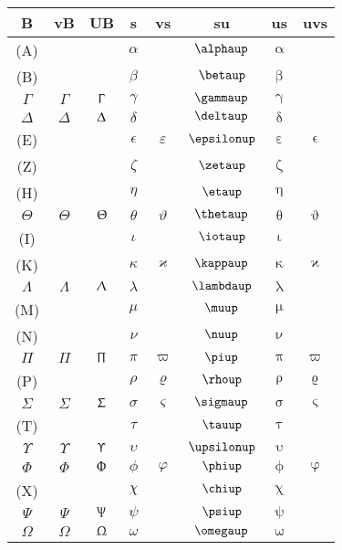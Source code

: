 \documentclass{article}
\begin{document}
\begin{tabular}{cccccccc}
	B 			&vB				&UB				&s			&vs				&su				& us			& uvs				\\\hline
	(A)			&				&				&$\alpha$	&				&$\alphaup$		&$\upalpha$		&					\\
	(B)			&				&				&$\beta$	&				&$\betaup$		&$\upbeta$		&					\\
	$\Gamma$	&$\varGamma$	&$\Upgamma$		&$\gamma$	&				&$\gammaup$		&$\upgamma$		&					\\
	$\Delta$	&$\varDelta$	&$\Updelta$		&$\delta$	&				&$\deltaup$		&$\updelta$		&					\\
	(E)			&				&				&$\epsilon$	&$\varepsilon$	&$\epsilonup$	&$\upepsilon$	&$\upvarepsilon$	\\
	(Z)			&				&				&$\zeta$	&				&$\zetaup$		&$\upzeta$		&					\\
	(H)			&				&				&$\eta$		&				&$\etaup$		&$\upeta$		&					\\
	$\Theta$	&$\varTheta$	&$\Uptheta$		&$\theta$	&$\vartheta$	&$\thetaup$		&$\uptheta$		&$\upvartheta$		\\
	(I)			&				&				&$\iota$	&				&$\iotaup$		&$\upiota$		&					\\
	(K)			&				&				&$\kappa$	&$\varkappa$	&$\kappaup$		&$\upkappa$		&$\upvarkappa$		\\
	$\Lambda$	&$\varLambda$	&$\Uplambda$	&$\lambda$	&				&$\lambdaup$	&$\uplambda$	&					\\
	(M)			&				&				&$\mu$		&				&$\muup$		&$\upmu$		&					\\
	(N)			&				&				&$\nu$		&				&$\nuup$		&$\upnu$		&					\\
	$\Pi$		&$\varPi$		&$\Uppi$		&$\pi$		&$\varpi$		&$\piup$		&$\uppi$		&$\upvarpi$			\\
	(P)			&				&				&$\rho$		&$\varrho$		&$\rhoup$		&$\uprho$		&$\upvarrho$		\\
	$\Sigma$	&$\varSigma$	&$\Upsigma$		&$\sigma$	&$\varsigma$	&$\sigmaup$		&$\upsigma$		&$\upvarsigma$		\\
	(T)			&				&				&$\tau$		&				&$\tauup$		&$\uptau$		&					\\
	$\Upsilon$	&$\varUpsilon$	&$\Upupsilon$	&$\upsilon$	&				&$\upsilonup$	&$\upupsilon$	&					\\
	$\Phi$		&$\varPhi$		&$\Upphi$		&$\phi$		&$\varphi$		&$\phiup$		&$\upphi$		&$\upvarphi$		\\
	(X)			&				&				&$\chi$		&				&$\chiup$		&$\upchi$		&					\\
	$\Psi$		&$\varPsi$		&$\Uppsi$		&$\psi$		&				&$\psiup$		&$\uppsi$		&					\\
	$\Omega$	&$\varOmega$	&$\Upomega$		&$\omega$	&				&$\omegaup$		&$\upomega$		&					\\
\end{tabular}
\end{document}
